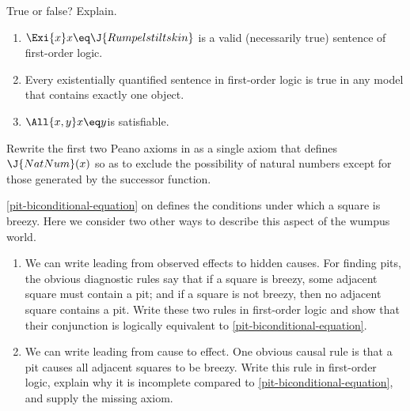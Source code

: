 \begin{iexercise}
True or false? Explain.
\begin{enumerate}
\item \(\Exi{x} x\eq \J{Rumpelstiltskin}\) is a valid (necessarily true) sentence of first-order logic.
\item Every existentially quantified sentence in first-order logic
is true in any model that contains exactly one object.
\item \(\All{x,y} x\eq y\)\quad is satisfiable.
\end{enumerate}
\end{iexercise} 



\begin{exercise}
Rewrite the first two Peano axioms in  as a single axiom that 
defines \(\J{NatNum}(x)\) so as to exclude the possibility of natural numbers except for those generated by the successor function.
\end{exercise} 

\begin{exercise}
\eqref{pit-biconditional-equation} on
 defines the conditions under which
a square is breezy.  Here we consider two other ways to describe this
aspect of the wumpus world.
\begin{enumerate}
\item We can write 
leading from observed effects to hidden causes. For finding pits, the obvious
diagnostic rules say that if a square is breezy, some adjacent
square must contain a pit; and if a square is not breezy, then no adjacent square contains a pit.
Write these two rules in first-order logic and show that their conjunction is logically equivalent to \eqref{pit-biconditional-equation}.
\item We can write  leading from cause to effect.
One obvious causal rule is that a pit causes all adjacent squares to be breezy.
Write this rule in first-order logic, explain why it is incomplete compared to \eqref{pit-biconditional-equation},
and supply the missing axiom.
\end{enumerate}
\end{exercise} 

